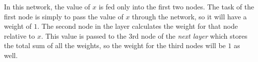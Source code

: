 \documentclass[12pt]{article}
\def\layersep{2.5cm}
\begin{document}
\begin{enumerate}
\begin{figure}[H]
\end{figure}

In this network, the value of $x$ is fed only into the first two nodes. The task of the first node is simply to pass the value of $x$ through the network, so it will have a weight of $1$. The second node in the layer calculates the weight for that node relative to $x$. This value is passed to the 3rd node of the {\em next layer} which stores the total sum of all the weights, so the weight for the third nodes will be $1$ as well.
\end{enumerate}
 
\end{document}

